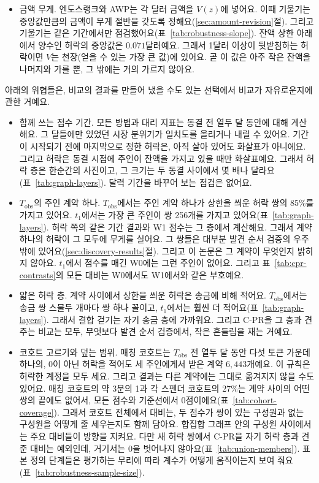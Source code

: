 \begin{itemize}
\item 금액 무게. 엔도스랭크와 AWP는 각 달러 금액을 $V(z)$에 넣어요. 이때 기울기는 중앙값만큼의 금액이 무게 절반을 갖도록 정해요(\ref{sec:amount-revision}절). 그리고 기울기는 같은 기간에서만 점검했어요(표~\ref{tab:robustness-slope}). 잔액 상한 아래에서 양수인 허락의 중앙값은 $0.071$달러예요. 그래서 1달러 이상이 뒷받침하는 허락이면 $V$는 천장(얻을 수 있는 가장 큰 값)에 있어요. 곧 이 값은 아주 작은 잔액을 나머지와 가를 뿐, 그 밖에는 거의 가르지 않아요.
\end{itemize}


아래의 위협들은, 비교의 결과를 만들어 냈을 수도 있는 선택에서 비교가 자유로운지에 관한 거예요.

\begin{itemize}
\item 함께 쓰는 점수 기간. 모든 방법과 대리 지표는 동결 전 열두 달 동안에 대해 계산해요. 그 달들에만 있었던 시장 분위기가 일치도를 올리거나 내릴 수 있어요. 기간이 시작되기 전에 마지막으로 정한 허락은, 아직 살아 있어도 화살표가 아니에요. 그리고 허락은 동결 시점에 주인이 잔액을 가지고 있을 때만 화살표예요. 그래서 허락 층은 한순간의 사진이고, 그 크기는 두 동결 사이에서 몇 배나 달라요(표~\ref{tab:graph-layers}). 달력 기간을 바꾸어 보는 점검은 없어요.
\item $T_{\mathrm{obs}}$의 주인 계약 하나. $T_{\mathrm{obs}}$에서는 주인 계약 하나가 상한을 씌운 허락 쌍의 85\%를 가지고 있어요. $t_1$에서는 가장 큰 주인이 쌍 256개를 가지고 있어요(표~\ref{tab:graph-layers}). 허락 쪽의 같은 기간 결과와 W1 점수는 그 층에서 계산해요. 그래서 계약 하나의 허락이 그 모두에 무게를 실어요. 그 쌍들은 대부분 발견 순서 검증의 우주 밖에 있어요(\ref{sec:discovery-results}절). 그리고 이 논문은 그 계약이 무엇인지 밝히지 않아요. $t_1$에서 점수를 매긴 W0에는 그런 주인이 없어요. 그리고 표~\ref{tab:cpr-contrasts}의 모든 대비는 W0에서도 W1에서와 같은 부호예요.
\item 얇은 허락 층. 계약 사이에서 상한을 씌운 허락은 송금에 비해 적어요. $T_{\mathrm{obs}}$에서는 송금 쌍 스물두 개마다 쌍 하나 꼴이고, $t_1$에서는 훨씬 더 적어요(표~\ref{tab:graph-layers}). 그래서 결합 걷기는 자기 송금 층에 가까워요. 그리고 \mbox{C-PR}을 그 층과 견주는 비교는 모두, 무엇보다 발견 순서 검증에서, 작은 흔들림을 재는 거예요.
\item 코호트 고르기와 덮는 범위. 매칭 코호트는 $T_{\mathrm{obs}}$ 전 열두 달 동안 다섯 토큰 가운데 하나의, 0이 아닌 허락을 적어도 세 주인에게서 받은 계약 $6{,}443$개예요. 이 규칙은 허락한 계정을 모두 세요. 그리고 결과는 다른 계약에는 그대로 옮겨지지 않을 수도 있어요. 매칭 코호트의 약 3분의 1과 각 스펜더 코호트의 27\%는 계약 사이의 어떤 쌍의 끝에도 없어서, 모든 점수와 기준선에서 0점이에요(표~\ref{tab:cohort-coverage}). 그래서 코호트 전체에서 대비는, 두 점수가 쌍이 있는 구성원과 없는 구성원을 어떻게 줄 세우는지도 함께 담아요. 합집합 그래프 안의 구성원 사이에서는 주요 대비들이 방향을 지켜요. 다만 새 허락 쌍에서 \mbox{C-PR}을 자기 허락 층과 견준 대비는 예외인데, 거기서는 0을 벗어나지 않아요(표~\ref{tab:union-members}). 표본 정의 단계들은 평가하는 무리에 따라 계수가 어떻게 움직이는지 보여 줘요(표~\ref{tab:robustness-sample-size}).

\end{itemize}
